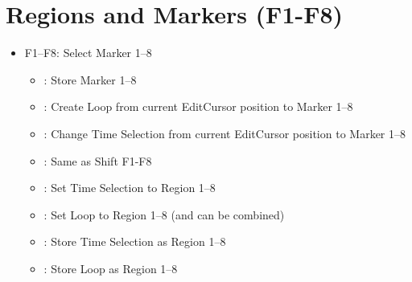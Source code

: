 \section{Regions and Markers (F1-F8)}\label{regions}
\begin{itemize}
\item F1--F8: Select Marker 1--8
\bemod
\begin{itemize}
	\item \control: Store Marker 1--8
	\item \shift: Create Loop from current EditCursor position to Marker 1--8
	\item \shift \option: Change Time Selection from current EditCursor position to Marker 1--8
	\item \shift \alt: Same as Shift F1-F8
	\item \option: Set Time Selection to Region 1--8
	\item \alt: Set Loop to Region 1--8 (\alt and \option can be combined)
	\item \control \option: Store Time Selection as Region 1--8
	\item \control \alt: Store Loop as Region 1--8
\end{itemize}
\end{itemize}
